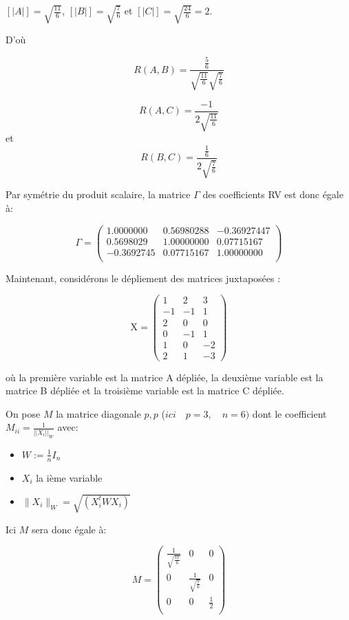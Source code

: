 \documentclass[
]{article}
\providecommand{\tightlist}{%
  \setlength{\itemsep}{0pt}\setlength{\parskip}{0pt}}
\begin{document}
\(\left[\left| A \right|\right] = \sqrt{\frac{11}{6} }\),
\(\left[\left| B \right|\right] = \sqrt{\frac{7}{6}}\) et
\(\left[\left| C \right|\right] = \sqrt{\frac{24}{6}} = 2\).

D'où

\[R(A ,B) = \frac{ \frac{5}{6} }{ \sqrt{\frac{11}{6}} \sqrt{\frac{7}{6}} } \]

\[R(A ,C) = \frac{ -1 }{ 2 \sqrt{\frac{11}{6}}} \] et
\[R(B ,C) = \frac{ \frac{1}{6} }{ 2 \sqrt{\frac{7}{6}} } \]

Par symétrie du produit scalaire, la matrice \(\Gamma\) des coefficients
RV est donc égale à:

\[\Gamma = \begin{pmatrix}
1.0000000 & 0.56980288 & -0.36927447 \\
0.5698029 & 1.00000000 & 0.07715167 \\
-0.3692745 & 0.07715167 & 1.00000000 \\
\end{pmatrix}\]

Maintenant, considérons le dépliement des matrices juxtaposées :

\[
\text{X} = \begin{pmatrix}
1 & 2 & 3 \\
-1 & -1 & 1 \\
2 & 0 & 0 \\
0 & -1 & 1 \\
1 & 0 & -2 \\
2 & 1 & -3
\end{pmatrix}
\]

où la première variable est la matrice A dépliée, la deuxième variable
est la matrice B dépliée et la troisième variable est la matrice C
dépliée.

On pose \(M\) la matrice diagonale \(p,p\)
(\(ici \quad p = 3, \quad n = 6 )\) dont le coefficient
\(M_{ii} = \frac{1}{||X_i||_W}\) avec:

\begin{itemize}
\tightlist
\item
  \(W:= \frac{1}{n} I_n\)
\item
  \(X_i\) la ième variable
\item
  \(\|X_i\|_W = \sqrt{(X_i^tWX_i)}\)
\end{itemize}

Ici \(M\) sera donc égale à:

\[M = \begin{pmatrix}
\frac{1}{\sqrt{\frac{11}{6}}} & 0 & 0 \\
0 & \frac{1}{\sqrt{\frac{7}{6}}} & 0 \\
0 & 0 & \frac{1}{2} \\
\end{pmatrix}\]
\end{document}
